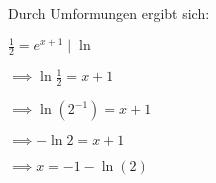 \item Durch Umformungen ergibt sich:

$\frac{1}{2}=e^{x+1}\;|\;\ln$

$\implies \ln{\frac{1}{2}}=x+1$

$\implies \ln({2^{-1}})=x+1$

$\implies -\ln 2 = x + 1$

$\implies x=-1-\ln(2)$

